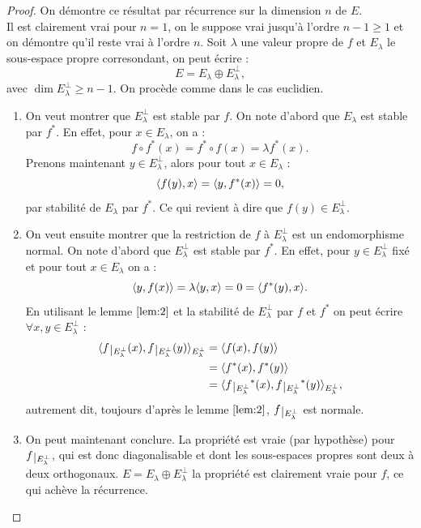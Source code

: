 \begin{proof}
On démontre ce résultat par récurrence sur la dimension $n$ de $E$. \\
Il est clairement vrai pour $n=1$, on le suppose vrai jusqu'à l'ordre $n-1 \geq 1$ et on démontre qu'il reste vrai à l'ordre $n$.
Soit $\lambda$ une valeur propre de $f$ et $E_{\lambda}$ le sous-espace propre corresondant, on peut écrire :
\[ E = E_{\lambda} \oplus E_{\lambda}^{\perp} , \]
avec $\dim{E_{\lambda}^{\perp}} \geq n-1$. On procède comme dans le cas euclidien.

\begin{enumerate}[label=(\alph*)]

\item
On veut montrer que $E_{\lambda}^{\perp}$ est stable par $f$. On note d'abord que $E_{\lambda}$ est stable par $f^{\ast}$.
En effet, pour $x \in E_{\lambda}$, on a :
\[ f \circ f^{\ast} (x) = f^{\ast} \circ f (x) = \lambda f^{\ast} (x) . \]
Prenons maintenant $y \in E_{\lambda}^{\perp}$, alors pour tout $x \in E_{\lambda}$ :
\[ \langle f(y) , x \rangle = \langle y , f^{\ast}(x) \rangle = 0 , \]
par stabilité de $E_{\lambda}$ par $f^{\ast}$. Ce qui revient à dire que $f(y) \in E_{\lambda}^{\perp}$.

\item
On veut ensuite montrer que la restriction de $f$ à $E_{\lambda}^{\perp}$ est un endomorphisme normal.
On note d'abord que $E_{\lambda}^{\perp}$ est stable par $f^{\ast}$. 
En effet, pour $y \in E_{\lambda}^{\perp}$ fixé et pour tout  $x \in E_{\lambda}$ on a :
\[ \langle y , f(x) \rangle = \lambda \langle y, x\rangle = 0 = \langle f^{\ast}(y), x\rangle . \]
En utilisant le lemme $\ref{lem:2}$ et la stabilité de $E_{\lambda}^{\perp}$ par $f$ et $f^{\ast}$ on peut écrire 
$\forall x, y \in E_{\lambda}^{\perp}$ :
\begin{align*}
\angl{ \restr{f}{E_{\lambda}^{\perp}}(x) , \restr{f}{E_{\lambda}^{\perp}}(y)}_{E_{\lambda}^{\perp}} & = \angl{ f(x), f(y) } \\
& = \angl{ f^{\ast}(x), f^{\ast}(y) } \\
& =  \angl{ \restr{f}{E_{\lambda}^{\perp}}^{\ast}(x) , \restr{f}{E_{\lambda}^{\perp}}^{\ast}(y)}_{E_{\lambda}^{\perp}} ,
\end{align*}
autrement dit, toujours d'après le lemme $\ref{lem:2}$, $\restr{f}{E_{\lambda}^{\perp}}$ est normale.

\item 
On peut maintenant conclure. La propriété est vraie (par hypothèse) pour $\restr{f}{E_{\lambda}^{\perp}}$, qui est donc diagonalisable
et dont les sous-espaces propres sont deux à deux orthogonaux. 
$E = E_{\lambda} \oplus E_{\lambda}^{\perp}$ la propriété est clairement vraie pour $f$, ce qui achève la récurrence.

\end{enumerate}
\end{proof}


